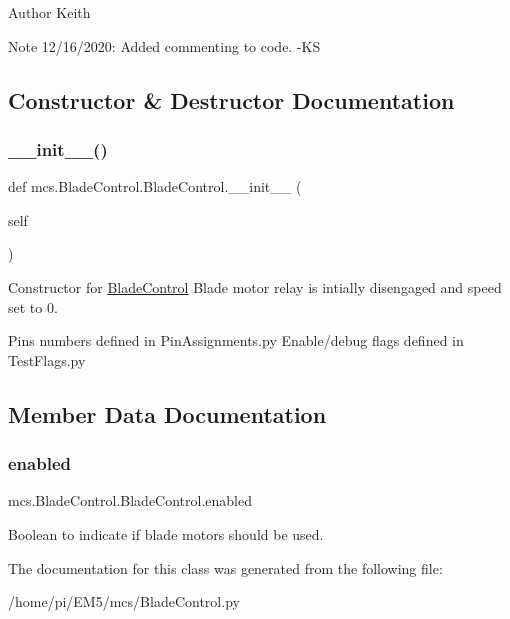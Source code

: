 \begin{DoxyAuthor}{Author}
Keith 
\end{DoxyAuthor}
\begin{DoxyNote}{Note}
12/16/2020\+: Added commenting to code. -\/\+KS 
\end{DoxyNote}


\subsection{Constructor \& Destructor Documentation}
\mbox{\label{classmcs_1_1BladeControl_1_1BladeControl_a37cb8ac7467a1274d14e267d6435d3e8}} 
\subsubsection{\texorpdfstring{\+\_\+\+\_\+init\+\_\+\+\_\+()}{\_\_init\_\_()}}
{\footnotesize\ttfamily def mcs.\+Blade\+Control.\+Blade\+Control.\+\_\+\+\_\+init\+\_\+\+\_\+ (\begin{DoxyParamCaption}\item[{}]{self }\end{DoxyParamCaption})}



Constructor for \hyperlink{classmcs_1_1BladeControl_1_1BladeControl}{Blade\+Control} Blade motor relay is intially disengaged and speed set to 0. 

Pins numbers defined in Pin\+Assignments.\+py Enable/debug flags defined in Test\+Flags.\+py 

\subsection{Member Data Documentation}
\mbox{\label{classmcs_1_1BladeControl_1_1BladeControl_a6b4ee49331139f85b85153f54d9bc164}} 
\subsubsection{\texorpdfstring{enabled}{enabled}}
{\footnotesize\ttfamily mcs.\+Blade\+Control.\+Blade\+Control.\+enabled}



Boolean to indicate if blade motors should be used. 



The documentation for this class was generated from the following file\+:\begin{DoxyCompactItemize}
\item 
/home/pi/\+E\+M5/mcs/Blade\+Control.\+py\end{DoxyCompactItemize}
